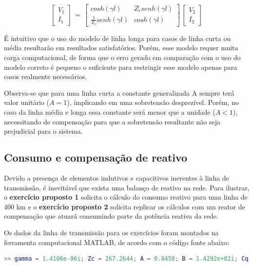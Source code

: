 \begin{equation} \label{top2:eq:5}
    \begin{bmatrix} V_1 \\ I_1  \end{bmatrix} \,=\, \begin{bmatrix} cosh(\gamma l) & Z_c senh(\gamma l) \\ \frac{1}{Z_c}senh(\gamma l) & cosh(\gamma l)  \end{bmatrix}\, \begin{bmatrix} V_2 \\ I_2  \end{bmatrix}
\end{equation}

É intuitivo que o uso do modelo de linha longa para casos de linha curta ou média resultarão em resultados satisfatórios. Porém, esse modelo requer muita carga computacional, de forma que o erro gerado em comparação com o uso do modelo correto é pequeno o suficiente para restringir esse modelo apenas para casos realmente necessários.

Observa-se que para uma linha curta a constante generalizada A sempre terá valor unitário ($A=1$), implicando em uma sobretensão desprezível. Porém, no caso da linha média e longa essa constante será menor que a unidade ($A<1$), necessitando de compensação para que a sobretensão resultante não seja prejudicial para o sistema.

\subsection{Consumo e compensação de reativo}

Devido a presença de elementos indutivos e capacitivos inerentes à linha de transmissão, é inevitável que exista uma balanço de reativo na rede. Para ilustrar, o \textbf{exercício proposto 1} solicita o cálculo do consumo reativo para uma linha de 400 km e o \textbf{exercício proposto 2} solicita replicar os cálculos com um reator de compensação que atuará consumindo parte da potência reativa da rede. 

Os dados da linha de transmissão para os exercícios foram montados na ferramenta computacional MATLAB, de acordo com o código fonte abaixo:



\begin{lstlisting}[language=Matlab,style=consolestyle]
>> gamma = 1.4106e-06i; Zc = 267.2644; A = 0.8450; B = 1.4292e+02i; Cq = 0.0020i; D = 0.8450;
\end{lstlisting}

